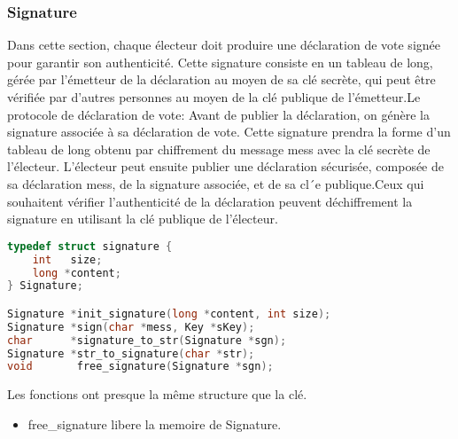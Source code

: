 \documentclass{article}
\begin{document}
\subsubsection{Signature}
\newline
Dans cette section, chaque électeur doit produire une déclaration de vote signée pour garantir son authenticité. Cette signature consiste en un tableau de long, gérée par l'émetteur de la déclaration au moyen de sa clé secrète, qui peut être vérifiée par d'autres personnes au moyen de la clé publique de l'émetteur.Le protocole de déclaration de vote:\newline
Avant de publier la déclaration, on génère la signature associée à sa déclaration de vote. Cette signature prendra la forme d’un tableau de long obtenu par chiffrement du message mess avec la clé secrète de l’électeur.\newline
L’électeur peut ensuite publier une déclaration sécurisée, composée de sa déclaration mess, de la signature associée, et de sa cl´e publique.Ceux qui souhaitent vérifier l'authenticité de la déclaration peuvent déchiffrement la signature en utilisant la clé publique de l'électeur.\newline
\begin{lstlisting}[language={C}]
typedef struct signature {
    int   size;
    long *content;
} Signature;

Signature *init_signature(long *content, int size);
Signature *sign(char *mess, Key *sKey);
char      *signature_to_str(Signature *sgn);
Signature *str_to_signature(char *str);
void       free_signature(Signature *sgn);
\end{lstlisting}
Les fonctions ont presque la même structure que la clé.
\begin{itemize}
    \item free\_signature libere la memoire de Signature.
\end{itemize}
\end{document}
